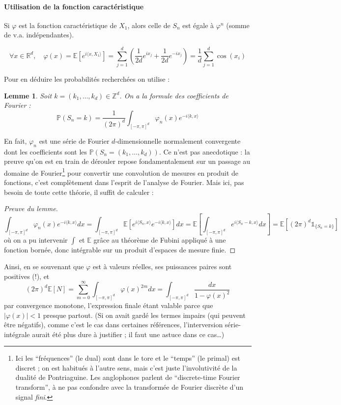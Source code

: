 \documentclass[a4paper, 11pt]{article}
\def\Z{\mathbb{Z}}
\def\P{\mathbb{P}}
\def\R{\mathbb{R}}
\def\E{\mathbb{E}}
\def\Indic{\mathbb{1}}
\newtheorem*{lemma}{Lemme}
\begin{document}
\paragraph{Utilisation de la fonction caractéristique}

Si $\varphi$ est la fonction caractéristique de $X_1$, alors celle de $S_n$
est égale à $\varphi^n$ (somme de v.a. indépendantes).

\[ \forall x \in \R^d,\quad \varphi(x) = \E\left[ e^{i \langle x, X_1 \rangle}
  \right]
  = \sum_{j=1}^d \left( \frac{1}{2d}e^{ix_j} + \frac{1}{2d}e^{-ix_j}\right)
  = \frac{1}{d} \sum_{j=1}^d \cos(x_i) \]

Pour en déduire les probabilités recherchées on utilise :
\begin{lemma} Soit $k = (k_1, \ldots, k_d) \in \Z^d$. On a la formule des
  coefficients de Fourier :
  \[ \displaystyle \P(S_n = k) = \frac{1}{(2\pi)^d} \int_{[-\pi,\pi]^d}
    \varphi_n(x)e^{-i\langle k,x \rangle} \]
\end{lemma}
En fait, $\varphi_n$ est une série de Fourier $d$-dimensionnelle normalement
convergente dont les coefficients sont les $\P(S_n = (k_1, \ldots, k_d))$. Ce
n'est pas anecdotique : la preuve qu'on est en train de dérouler repose
fondamentalement sur un passage au domaine de Fourier\footnote{Ici les
  \enquote{fréquences} (le dual) sont dans le tore et le \enquote{temps} (le
  primal) est discret ; on est habitués à l'autre sens, mais c'est juste
  l'involutivité de la dualité de Pontriaguine. Les anglophones parlent de
  \enquote{discrete-time Fourier transform}, à ne pas confondre avec la
  transformée de Fourier discrète d'un signal \emph{fini}.} pour convertir une
convolution de mesures en produit de fonctions, c'est complètement dans l'esprit
de l'analyse de Fourier. Mais ici, pas besoin de toute cette théorie, il suffit
de calculer :
\begin{proof}[Preuve du lemme]
  \[ \int_{[-\pi,\pi]^d} \varphi_n(x)e^{-i\langle k,x \rangle} dx =
    \int_{[-\pi,\pi]^d} \E\left[ e^{i\langle S_n, x \rangle} e^{-i\langle k,x
        \rangle}\right] dx
    = \E\left[ \int_{[-\pi,\pi]^d} e^{i\langle S_n - k, x \rangle} dx \right]
    = \E\left[ (2\pi)^d \Indic_{\{S_n = k\}} \right] \]
  où on a pu intervenir $\int$ et $\E$ grâce au théorème de Fubini appliqué à
  une fonction bornée, donc intégrable sur un produit d'espaces de mesure finie.
\end{proof}
Ainsi, en se souvenant que $\varphi$ est à valeurs réelles, ses puissances
paires sont positives (!), et
\[ (2\pi)^d \E[N] = \sum_{m=0}^{\infty} \int_{[-\pi,\pi]^d} \varphi(x)^{2m} dx
  = \int_{[-\pi,\pi]^d} \frac{dx}{1 - \varphi(x)^2}\]
par convergence monotone, l'expression finale étant valable parce que
$|\varphi(x)| < 1$ presque partout. (Si on avait gardé les termes impairs (qui
peuvent être négatifs), comme c'est le cas dans certaines références,
l'interversion série-intégrale aurait été plus dure à justifier ; il faut une
astuce dans ce cas…)
\end{document}
